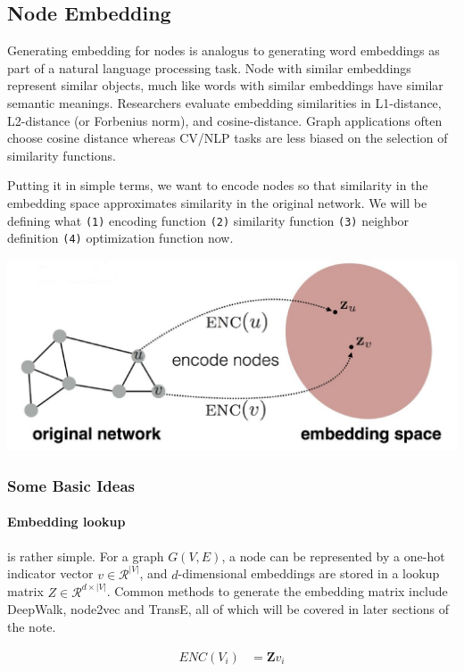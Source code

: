 \subsection{Node Embedding}

Generating embedding for nodes is analogus to generating word embeddings as part of a natural language processing task. Node with similar embeddings represent similar objects, much like words with similar embeddings have similar semantic meanings. Researchers evaluate embedding similarities in L1-distance, L2-distance (or Forbenius norm), and cosine-distance. Graph applications often choose cosine distance whereas CV/NLP tasks are less biased on the selection of similarity functions.

Putting it in simple terms, we want to encode nodes so that similarity in the embedding space approximates similarity in the original network. We will be defining what \texttt{(1)} encoding function \texttt{(2)} similarity function \texttt{(3)} neighbor definition \texttt{(4)} optimization function now.

{
\centering
\includegraphics[width=0.65\linewidth]{notes/img/l7_p12_embedding.JPG} \par
}

\subsubsection{Some Basic Ideas}

\paragraph{Embedding lookup} is rather simple. For a graph $G(V, E)$, a node can be represented by a one-hot indicator vector $v \in \mathcal{R}^{|V|}$, and $d$-dimensional embeddings are stored in a lookup matrix $Z \in \mathcal{R}^{d \times |V|}$. Common methods to generate the embedding matrix include DeepWalk, node2vec and TransE, all of which will be covered in later sections of the note.

\begin{align}
    ENC(V_i) &= \mathbf{Z}v_i
\end{align}


